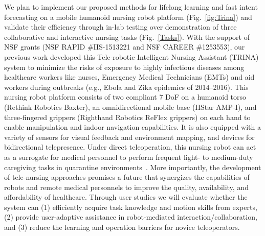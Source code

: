 \documentclass[letterpaper, 11 pt, onecolumn]{article}
\newcommand{\fig}[1]{Fig.~\ref{#1}}
\begin{document}
\noindent
We plan to implement our proposed methods for lifelong learning and fast intent forecasting on a mobile humanoid nursing robot platform (\fig{fig:Trina}) and validate their efficiency through in-lab testing over demonstration of three collaborative and interactive nursing tasks (\fig{Tasks}). With the support of NSF grants (NSF RAPID \#IIS-1513221 and NSF CAREER \#1253553), our previous work developed this Tele-robotic Intelligent Nursing Assistant (TRINA) system to minimize the risks of exposure to highly infectious diseases among healthcare workers like nurses, Emergency Medical Technicians (EMTs) and aid workers during outbreaks (e.g., Ebola and Zika epidemics of 2014--2016). This nursing robot platform consists of two compliant 7 DoF on a humanoid torso (Rethink Robotics Baxter), an omnidirectional mobile base (HStar AMP-I), and three-fingered grippers (Righthand Robotics ReFlex grippers) on each hand to enable manipulation and indoor navigation capabilities. It is also equipped with a variety of sensors for visual feedback and environment mapping, and devices for bidirectional telepresence. Under direct teleoperation, this nursing robot can act as a surrogate for medical personnel to perform frequent light- to medium-duty caregiving tasks in quarantine environments~\cite{Hauser_Li_TRINA:17}. More importantly, the development of tele-nursing approaches promises a future that synergizes the capabilities of robots and remote medical personnels to improve the quality, availability, and affordability of healthcare. Through user studies we will evaluate whether the system can (1) efficiently acquire task knowledge and motion skills from experts, (2) provide user-adaptive assistance in robot-mediated interaction/collaboration, and (3) reduce the learning and operation barriers for novice teleoperators. 

\end{document}
